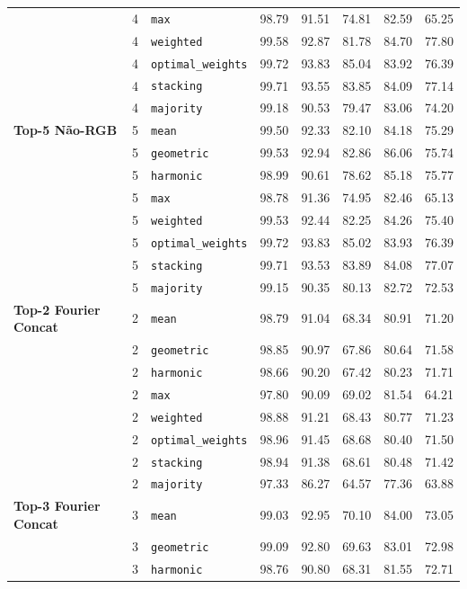 \begin{table}[t]
\begin{tabular}{l c l c c c c}
 & 4 & \texttt{max} & 98.79 & 91.51 & 74.81 & 82.59 & 65.25 \\
 & 4 & \texttt{weighted} & 99.58 & 92.87 & 81.78 & 84.70 & 77.80 \\
 & 4 & \texttt{optimal_weights} & 99.72 & 93.83 & 85.04 & 83.92 & 76.39 \\
 & 4 & \texttt{stacking} & 99.71 & 93.55 & 83.85 & 84.09 & 77.14 \\
 & 4 & \texttt{majority} & 99.18 & 90.53 & 79.47 & 83.06 & 74.20 \\
\midrule
\textbf{Top-5 Não-RGB} & 5 & \texttt{mean} & 99.50 & 92.33 & 82.10 & 84.18 & 75.29 \\
 & 5 & \texttt{geometric} & 99.53 & 92.94 & 82.86 & 86.06 & 75.74 \\
 & 5 & \texttt{harmonic} & 98.99 & 90.61 & 78.62 & 85.18 & 75.77 \\
 & 5 & \texttt{max} & 98.78 & 91.36 & 74.95 & 82.46 & 65.13 \\
 & 5 & \texttt{weighted} & 99.53 & 92.44 & 82.25 & 84.26 & 75.40 \\
 & 5 & \texttt{optimal_weights} & 99.72 & 93.83 & 85.02 & 83.93 & 76.39 \\
 & 5 & \texttt{stacking} & 99.71 & 93.53 & 83.89 & 84.08 & 77.07 \\
 & 5 & \texttt{majority} & 99.15 & 90.35 & 80.13 & 82.72 & 72.53 \\
\midrule
\textbf{Top-2 Fourier Concat} & 2 & \texttt{mean} & 98.79 & 91.04 & 68.34 & 80.91 & 71.20 \\
 & 2 & \texttt{geometric} & 98.85 & 90.97 & 67.86 & 80.64 & 71.58 \\
 & 2 & \texttt{harmonic} & 98.66 & 90.20 & 67.42 & 80.23 & 71.71 \\
 & 2 & \texttt{max} & 97.80 & 90.09 & 69.02 & 81.54 & 64.21 \\
 & 2 & \texttt{weighted} & 98.88 & 91.21 & 68.43 & 80.77 & 71.23 \\
 & 2 & \texttt{optimal_weights} & 98.96 & 91.45 & 68.68 & 80.40 & 71.50 \\
 & 2 & \texttt{stacking} & 98.94 & 91.38 & 68.61 & 80.48 & 71.42 \\
 & 2 & \texttt{majority} & 97.33 & 86.27 & 64.57 & 77.36 & 63.88 \\
\midrule
\textbf{Top-3 Fourier Concat} & 3 & \texttt{mean} & 99.03 & 92.95 & 70.10 & 84.00 & 73.05 \\
 & 3 & \texttt{geometric} & 99.09 & 92.80 & 69.63 & 83.01 & 72.98 \\
 & 3 & \texttt{harmonic} & 98.76 & 90.80 & 68.31 & 81.55 & 72.71 \\

\end{tabular}
\end{table}
